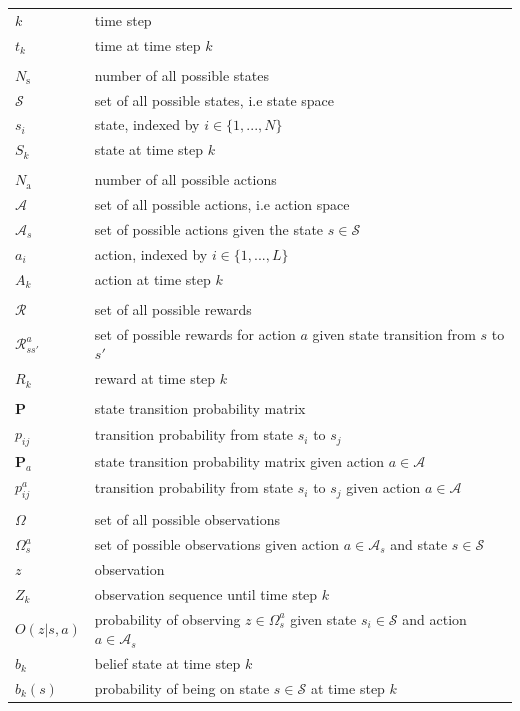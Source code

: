 \documentclass[english, 12pt, a4paper, elec, utf8, a-1b, online]{aaltothesis}
\renewcommand{\vec}[1]{\mathbf{#1}}
\newcommand{\Ss}{\mathcal{S}}
\newcommand{\As}{\mathcal{A}}
\newcommand{\Rs}{\mathcal{R}}
\newcommand{\Os}{\Omega}
\newcommand{\Op}{O}
\newcommand{\stprobs}{\vec{P}}
\newcommand{\nacts}{{N_\text{a}}}
\newcommand{\nstates}{{N_\text{s}}}
\begin{document}
\begin{longtable}{ll}
$k$ & time step \\
$t_k$ & time at time step $k$ \\
&\\
$\nstates$ & number of all possible states \\
$\Ss$ & set of all possible states, i.e state space \\
$s_i$ & state, indexed by $i \in \{1, ..., N\}$ \\
$S_k$ & state at time step $k$ \\
&\\
$\nacts$ & number of all possible actions \\
$\As$ & set of all possible actions, i.e action space \\
$\As_s$ & set of possible actions given the state $s \in \Ss$ \\
$a_i$ & action, indexed by $i \in \{1, ..., L\}$ \\
$A_k$ & action at time step $k$ \\
&\\
$\Rs$ & set of all possible rewards \\
$\Rs_{ss'}^a$ & set of possible rewards for action $a$ given state transition from $s$ to $s'$ \\
$R_k$ & reward at time step $k$ \\
&\\
$\stprobs$ & state transition probability matrix \\
$p_{ij}$ & transition probability from state $s_i$ to $s_j$ \\
$\stprobs_a$ & state transition probability matrix given action $a \in \As$ \\
$p_{ij}^a$ & transition probability from state $s_i$ to $s_j$ given action $a\in \As$\\
&\\
$\Os$ & set of all possible observations \\
$\Os_s^a$ & set of possible observations given action $a \in \As_s$ and state $s \in \Ss $ \\
$z$ & observation \\
$Z_k$ & observation sequence until time step $k$ \\
$\Op(z | s, a)$ & probability of observing $z \in \Os_s^a$ given state $s_i \in \Ss$ and action $a \in \As_s$ \\
$b_k$ & belief state at time step $k$ \\
$b_k(s)$ & probability of being on state $s \in \Ss$ at time step $k$ \\


\end{longtable}
\end{document}
